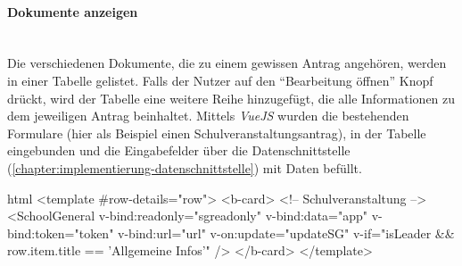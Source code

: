 \paragraph{Dokumente anzeigen}
~\\
Die verschiedenen Dokumente, die zu einem gewissen Antrag angehören, werden in einer Tabelle gelistet. Falls der Nutzer auf den \enquote{Bearbeitung öffnen} Knopf drückt, wird der Tabelle eine weitere Reihe hinzugefügt, die alle Informationen zu dem jeweiligen Antrag beinhaltet. Mittels \textit{VueJS} wurden die bestehenden Formulare (hier als Beispiel einen Schulveranstaltungsantrag), in der Tabelle eingebunden und die Eingabefelder über die Datenschnittstelle (\autoref{chapter:implementierung-datenschnittstelle}) mit Daten befüllt.
\begin{code}{html}
	<template #row-details="row">
        <b-card>
            <!-- Schulveranstaltung -->
            <SchoolGeneral
            v-bind:readonly="sgreadonly"
            v-bind:data="app"
            v-bind:token="token"
            v-bind:url="url"
            v-on:update="updateSG"
            v-if="isLeader && row.item.title == 'Allgemeine Infos'"
            />
		</b-card>
	</template>
\end{code}
	\label{list:docanz} ~\\

